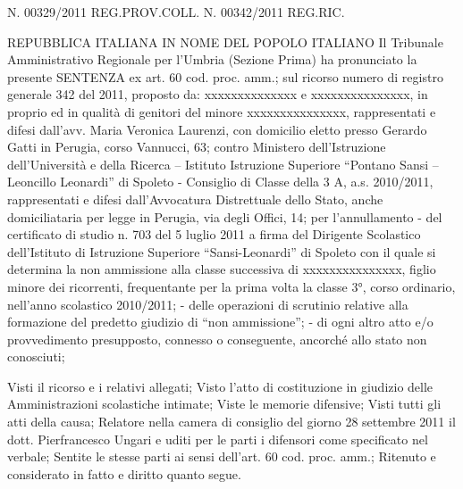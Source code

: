 N. 00329/2011 REG.PROV.COLL.
N. 00342/2011 REG.RIC.

REPUBBLICA ITALIANA
IN NOME DEL POPOLO ITALIANO
Il Tribunale Amministrativo Regionale per l’Umbria
(Sezione Prima)
ha pronunciato la presente
SENTENZA
ex art. 60 cod. proc. amm.;
sul ricorso numero di registro generale 342 del 2011, proposto da:
xxxxxxxxxxxxxx e xxxxxxxxxxxxxxx, in proprio ed in qualità di genitori del minore xxxxxxxxxxxxxxx, rappresentati e difesi dall’avv. Maria Veronica Laurenzi, con domicilio eletto presso Gerardo Gatti in Perugia, corso Vannucci, 63; 
contro
Ministero dell’Istruzione dell’Università e della Ricerca – Istituto Istruzione Superiore “Pontano Sansi – Leoncillo Leonardi” di Spoleto - Consiglio di Classe della 3 A, a.s. 2010/2011, rappresentati e difesi dall’Avvocatura Distrettuale dello Stato, anche domiciliataria per legge in Perugia, via degli Offici, 14; 
per l’annullamento
- del certificato di studio n. 703 del 5 luglio 2011 a firma del Dirigente Scolastico dell’Istituto di Istruzione Superiore “Sansi-Leonardi” di Spoleto con il quale si determina la non ammissione alla classe successiva di xxxxxxxxxxxxxxx, figlio minore dei ricorrenti, frequentante per la prima volta la classe 3°, corso ordinario, nell’anno scolastico 2010/2011;
- delle operazioni di scrutinio relative alla formazione del predetto giudizio di “non ammissione”;
- di ogni altro atto e/o provvedimento presupposto, connesso o conseguente, ancorché allo stato non conosciuti;

Visti il ricorso e i relativi allegati;
Visto l’atto di costituzione in giudizio delle Amministrazioni scolastiche intimate;
Viste le memorie difensive;
Visti tutti gli atti della causa;
Relatore nella camera di consiglio del giorno 28 settembre 2011 il dott. Pierfrancesco Ungari e uditi per le parti i difensori come specificato nel verbale;
Sentite le stesse parti ai sensi dell’art. 60 cod. proc. amm.;
Ritenuto e considerato in fatto e diritto quanto segue.


